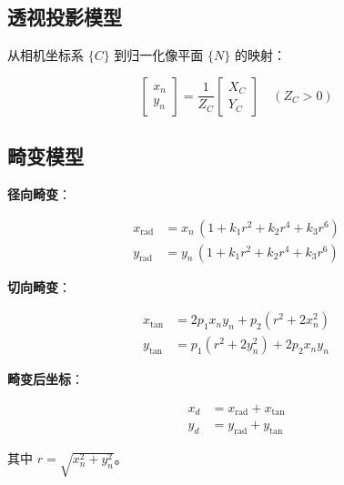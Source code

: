 \documentclass[12pt,a4paper]{article}
\begin{document}
\subsection{透视投影模型}

从相机坐标系 $\{C\}$ 到归一化像平面 $\{N\}$ 的映射：

\begin{equation}
\begin{bmatrix} x_n \\ y_n \end{bmatrix}
=
\frac{1}{Z_C}
\begin{bmatrix} X_C \\ Y_C \end{bmatrix}
\quad (Z_C > 0)
\label{eq:perspective_projection}
\end{equation}

\subsection{畸变模型}

\textbf{径向畸变}：

\begin{equation}
\begin{aligned}
x_{\text{rad}} &= x_n \, (1 + k_1 r^2 + k_2 r^4 + k_3 r^6) \\
y_{\text{rad}} &= y_n \, (1 + k_1 r^2 + k_2 r^4 + k_3 r^6)
\end{aligned}
\label{eq:radial_distortion}
\end{equation}

\textbf{切向畸变}：

\begin{equation}
\begin{aligned}
x_{\text{tan}} &= 2 p_1 x_n y_n + p_2 (r^2 + 2 x_n^2) \\
y_{\text{tan}} &= p_1 (r^2 + 2 y_n^2) + 2 p_2 x_n y_n
\end{aligned}
\label{eq:tangential_distortion}
\end{equation}

\textbf{畸变后坐标}：

\begin{equation}
\begin{aligned}
x_d &= x_{\text{rad}} + x_{\text{tan}} \\
y_d &= y_{\text{rad}} + y_{\text{tan}}
\end{aligned}
\label{eq:distorted_coordinates}
\end{equation}

其中 $r = \sqrt{x_n^2 + y_n^2}$。
\end{document}

